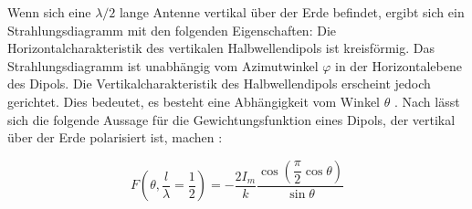 Wenn sich eine $\lambda /2$ lange Antenne vertikal über der Erde befindet, ergibt sich ein Strahlungsdiagramm mit den folgenden Eigenschaften: 
Die Horizontalcharakteristik des vertikalen Halbwellendipols ist kreisförmig. Das Strahlungsdiagramm ist unabhängig vom Azimutwinkel $\varphi$ in der Horizontalebene des Dipols. Die Vertikalcharakteristik des Halbwellendipols erscheint jedoch gerichtet. Dies bedeutet, es besteht eine Abhängigkeit vom Winkel $\theta$ \cite{zinke1965lehrbuch}. 
Nach \cite{elliott1981antenna} lässt sich die folgende Aussage für die Gewichtungsfunktion eines Dipols, der vertikal über der Erde polarisiert ist, machen \cite{elliott1981antenna}:

\begin{equation}\label{eq:FDipolTheat}
F(\theta,\frac{l}{\lambda}=\dfrac{1}{2})=-\dfrac{2I_{m}}{k}\dfrac{\cos\left(\dfrac{\pi}{2}\cos\theta\right)}{\sin\theta}
\end{equation}


